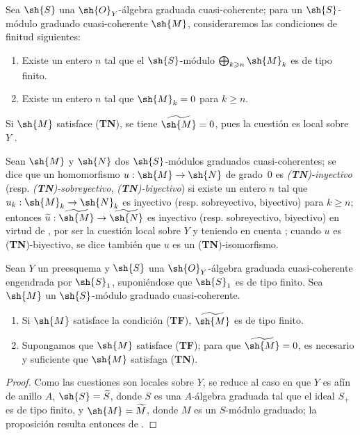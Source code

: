 \documentclass[oneside,10pt]{amsart}
\makeatletter
\renewcommand{\geq}{\geqslant}
\newcommand{\ega@arrow}[2]{\mathchoice{#1}{#2}{#2}{#2}}
\renewcommand{\to}{\ega@arrow{\longrightarrow}{\rightarrow}}
\let\EGAOriginalLabel\label
\renewcommand{\label}[1]{\phantomsection\EGAOriginalLabel{#1}}
\makeatother
\begin{document}
\begin{env}[3.4.2]
\label{II.3.4.2}
Sea $\sh{S}$ una $\sh{O}_Y$-álgebra graduada cuasi-coherente; para un $\sh{S}$-módulo graduado cuasi-coherente $\sh{M}$, consideraremos las condiciones de finitud siguientes:
\begin{enumerate}
  \item[(\textbf{TF})] Existe un entero $n$ tal que el $\sh{S}$-módulo $\bigoplus_{k\geq n}\sh{M}_k$ es de tipo finito.
  \item[(\textbf{TN})] Existe un entero $n$ tal que $\sh{M}_k=0$ para $k\geq n$.
\end{enumerate}

Si $\sh{M}$ satisface (\textbf{TN}), se tiene $\widetilde{\sh{M}}=0$, pues la cuestión es local sobre $Y$ .

Sean $\sh{M}$ y $\sh{N}$ dos $\sh{S}$-módulos graduados cuasi-coherentes; se dice que un homomorfismo $u:\sh{M}\to\sh{N}$ de grado~$0$ es \emph{(\textbf{TN})-inyectivo} (resp. \emph{(\textbf{TN})-sobreyectivo}, \emph{(\textbf{TN})-biyectivo}) si existe un entero $n$ tal que $u_k:\sh{M}_k\to\sh{N}_k$ es inyectivo (resp. sobreyectivo, biyectivo) para $k\geq n$; entonces $\widetilde{u}:\widetilde{\sh{M}}\to\widetilde{\sh{N}}$ es inyectivo (resp. sobreyectivo, biyectivo) en virtud de , por ser la cuestión local sobre $Y$ y teniendo en cuenta ; cuando $u$ es (\textbf{TN})-biyectivo, se dice también que $u$ es un (\textbf{TN})-isomorfismo.
\end{env}

\begin{proposition}[3.4.3]
\label{II.3.4.3}
Sean $Y$ un preesquema y $\sh{S}$ una $\sh{O}_Y$-álgebra graduada cuasi-coherente engendrada por $\sh{S}_1$, suponiéndose que $\sh{S}_1$ es de tipo finito.
Sea $\sh{M}$ un $\sh{S}$-módulo graduado cuasi-coherente.
\begin{enumerate}
  \item[(i)] Si $\sh{M}$ satisface la condición \textup{(\textbf{TF})}, $\widetilde{\sh{M}}$ es de tipo finito.
  \item[(ii)] Supongamos que $\sh{M}$ satisface \textup{(\textbf{TF})}; para que $\widetilde{\sh{M}}=0$, es necesario y suficiente que $\sh{M}$ satisfaga \textup{(\textbf{TN})}.
\end{enumerate}
\end{proposition}

\begin{proof}
Como las cuestiones son locales sobre $Y$, se reduce al caso en que $Y$ es afín de anillo $A$, $\sh{S}=\widetilde{S}$, donde $S$ es una $A$-álgebra graduada tal que el ideal $S_+$ es de tipo finito, y $\sh{M}=\widetilde{M}$, donde $M$ es un $S$-módulo graduado; la proposición resulta entonces de .
\end{proof}
\end{document}
